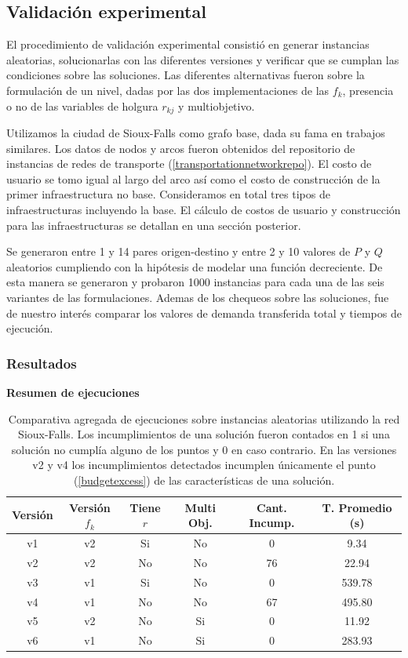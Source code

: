 \documentclass{article}
\begin{document}
  \FloatBarrier
  \subsection{Validación experimental}

  El procedimiento de validación experimental consistió en generar instancias aleatorias, solucionarlas con las diferentes versiones y verificar que se cumplan las condiciones sobre las soluciones. Las diferentes alternativas fueron sobre la formulación de un nivel, dadas por las dos implementaciones de las $f_k$, presencia o no de las variables de holgura $r_{kj}$ y multiobjetivo.

  Utilizamos la ciudad de Sioux-Falls como grafo base, dada su fama en trabajos similares. Los datos de nodos y arcos fueron obtenidos del repositorio de instancias de redes de transporte (\ref{transportationnetworkrepo}). El costo de usuario se tomo igual al largo del arco así como el costo de construcción de la primer infraestructura no base. Consideramos en total tres tipos de infraestructuras incluyendo la base. El cálculo de costos de usuario y construcción para las infraestructuras se detallan en una sección posterior.

  Se generaron entre 1 y 14 pares origen-destino y entre 2 y 10 valores de $P$ y $Q$ aleatorios cumpliendo con la hipótesis de modelar una función decreciente.
  De esta manera se generaron y probaron 1000 instancias para cada una de las seis variantes de las formulaciones. Ademas de los chequeos sobre las soluciones, fue de nuestro interés comparar los valores de demanda transferida total y tiempos de ejecución.

  \FloatBarrier
  \subsubsection{Resultados}

  \begin{table}[h!]
    \centering
    \caption*{{\bf Resumen de ejecuciones}}
    \begin{tabular}{cccccc}
      \toprule
      Versión & Versión $f_k$ & Tiene $r$ & Multi Obj. & Cant. Incump. & T. Promedio (s) \\
      \midrule
      v1 & v2 & Si & No & 0   & 9.34    \\
      v2 & v2 & No & No & 76  & 22.94   \\
      v3 & v1 & Si & No & 0   & 539.78  \\
      v4 & v1 & No & No & 67  & 495.80  \\
      v5 & v2 & No & Si & 0   & 11.92   \\
      v6 & v1 & No & Si & 0   & 283.93  \\
      \bottomrule
    \end{tabular}
    \caption{Comparativa agregada de ejecuciones sobre instancias aleatorias utilizando la red Sioux-Falls. Los incumplimientos de una solución fueron contados en 1 si una solución no cumplía alguno de los puntos y 0 en caso contrario. En las versiones v2 y v4 los incumplimientos detectados incumplen únicamente el punto (\ref{budgetexcess}) de las características de una solución.}\label{table:resumenejecuciones}
  \end{table}
\end{document}

